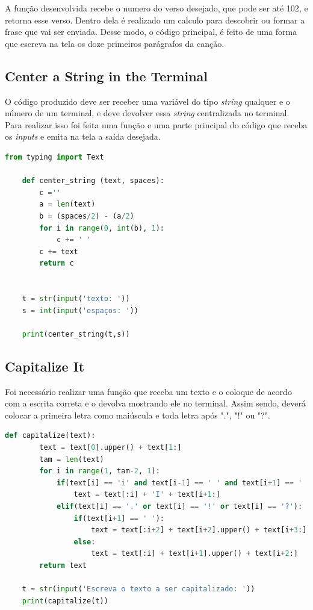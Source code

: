 A função desenvolvida recebe o numero do verso desejado, que pode ser até 102, e retorna esse verso. Dentro dela é realizado um calculo para descobrir ou formar a frase que vai ser enviada. Desse modo, o código principal, é feito de uma forma que escreva na tela os doze primeiros parágrafos da canção.

\subsection{Center a String in the Terminal}

O código produzido deve ser receber uma variável do tipo \textit{string} qualquer e o número de um terminal, e deve devolver essa \textit{string} centralizada no terminal. Para realizar isso foi feita uma função e uma parte principal do código que receba os \textit{inputs} e emita na tela a saída desejada.

\begin{lstlisting}[language=Python]
    from typing import Text

    def center_string (text, spaces):
        c =''
        a = len(text)
        b = (spaces/2) - (a/2) 
        for i in range(0, int(b), 1):
            c += ' '
        c += text
        return c


    t = str(input('texto: '))
    s = int(input('espaços: '))

    print(center_string(t,s))

\end{lstlisting}

\subsection{Capitalize It}

Foi necessário realizar uma função que receba um texto e o coloque de acordo com a escrita correta e o devolva mostrando ele no terminal. Assim sendo, deverá colocar a primeira letra como maiúscula e toda letra após ".", "!" ou "?".

\begin{lstlisting}[language=Python]
    def capitalize(text):
        text = text[0].upper() + text[1:]
        tam = len(text)
        for i in range(1, tam-2, 1):
            if(text[i] == 'i' and text[i-1] == ' ' and text[i+1] == ' '):
                text = text[:i] + 'I' + text[i+1:]
            elif(text[i] == '.' or text[i] == '!' or text[i] == '?'):
                if(text[i+1] == ' '):
                    text = text[:i+2] + text[i+2].upper() + text[i+3:]
                else:
                    text = text[:i] + text[i+1].upper() + text[i+2:]
        return text

    t = str(input('Escreva o texto a ser capitalizado: '))
    print(capitalize(t))

\end{lstlisting}

